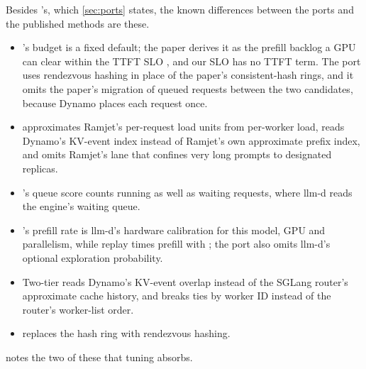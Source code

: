 Besides 's, which \cref{sec:ports} states, the known differences between the ports
and the published methods are these.
\begin{itemize}
  \item {}'s budget is a fixed default; the paper derives it as the prefill backlog
    a GPU can clear within the TTFT SLO \citep{yuan2026dualmap}, and our SLO has no TTFT term.
    The port uses rendezvous hashing in place of the paper's consistent-hash rings, and it omits
    the paper's migration of queued requests between the two candidates, because Dynamo places
    each request once.
  \item {} approximates Ramjet's per-request load units from per-worker load, reads
    Dynamo's KV-event index instead of Ramjet's own approximate prefix index, and omits Ramjet's
    lane that confines very long prompts to designated replicas.
  \item {}'s queue score counts running as well as waiting requests,
    where llm-d reads the engine's waiting queue.
  \item {}'s prefill rate is llm-d's hardware calibration for this
    model, GPU and parallelism, while replay times prefill with \ais{}; the port also omits
    llm-d's optional exploration probability.
  \item Two-tier reads Dynamo's KV-event overlap instead of the SGLang router's approximate cache
    history, and breaks ties by worker ID instead of the router's worker-list order.
  \item {} replaces the hash ring with rendezvous hashing.
\end{itemize}
 notes the two of these that tuning absorbs.
